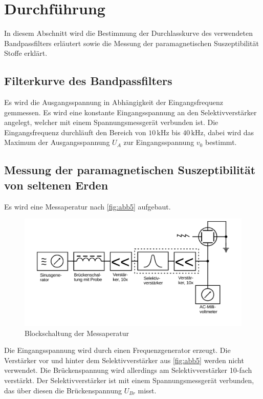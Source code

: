 \section{Durchführung}
\label{sec:Durchführung}
In diesem Abschnitt wird die Bestimmung der Durchlasskurve des verwendeten Bandpassfilters erläutert sowie die Messung der paramagnetischen Suszeptibilität Stoffe erklärt.

\subsection{Filterkurve des Bandpassfilters}
Es wird die Ausgangsspannung in Abhängigkeit der Eingangsfrequenz gemmessen. Es wird eine konstante Eingangsspannung an den Selektivverstärker angelegt, welcher mit einem Spannungsmessgerät verbunden ist. 
Die Eingangsfrequenz durchläuft den Bereich von $ 10 \, \unit{\kilo\hertz}$ bis $40 \, \unit{\kilo\hertz}$, dabei wird das Maximum der Ausgangsspannung $ U_{A} $ zur Eingangsspannung $ v_0$ bestimmt.


\subsection{Messung der paramagnetischen Suszeptibilität von seltenen Erden}
Es wird eine Messaperatur nach \autoref{fig:abb5} aufgebaut.
\begin{figure}[H]
    \centering
    \includegraphics{figures/Abb_5.pdf}
    \caption{Blockschaltung der Messaperatur}
    \label{fig:abb5}
\end{figure} 

Die Eingangsspannung wird durch einen Frequenzgenerator erzeugt.
Die Verstärker vor und hinter dem Selektivverstärker aus \autoref{fig:abb5} werden nicht verwendet. Die Brückenspannung wird allerdings am Selektivverstärker 10-fach verstärkt. Der Selektivverstärker ist mit einem Spannungsmessgerät verbunden, das über diesen die Brückenspannung $ U_{Br}$ misst.